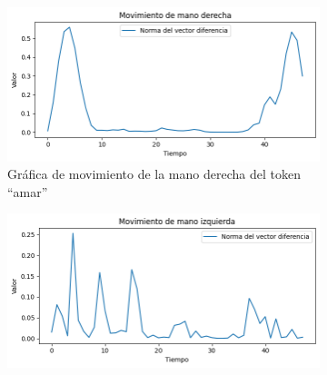 \begin{figure}[t]
	\begin{subfigure}[t]{0.3\textwidth}
	\centering
		\includegraphics[align=t,width=0.9\linewidth, height =0.9\linewidth]{Graphics/amar_rhand_movediff_original_nu.png}
		\caption{Gráfica de movimiento de la mano derecha del token ``amar''}
		\label{f:rhand_movediff_amar}
	\end{subfigure}
	\begin{subfigure}[t]{0.3\textwidth}
	\centering
		\includegraphics[align=t,width=0.9\linewidth, height =0.9\linewidth]{Graphics/amar_lhand_movediff_original_nu.png}

\end{subfigure}
\end{figure}

